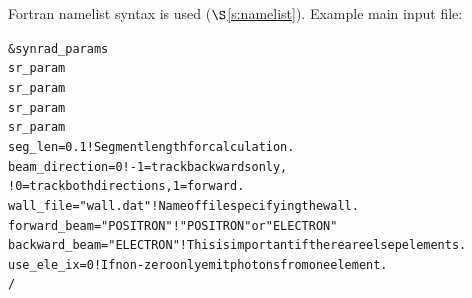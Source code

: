 \documentclass[11pt]{article}
\newcommand{\sref}[1]{$\S$\ref{#1}}
\newenvironment{example}
  {\vspace{-3.0ex} \begin{alltt}}
  {\end{alltt} \vspace{-2.5ex}}
\begin{document}
Fortran namelist syntax is used (\sref{s:namelist}). Example main
input file:
\begin{example}
  &synrad_params
    sr_param%
    sr_param%
    sr_param%
    sr_param%
    seg_len = 0.1                    ! Segment length for calculation.
    beam_direction = 0               ! -1 = track backwards only,
                                     !  0 = track both directions, 1 = forward.
    wall_file = "wall.dat"           ! Name of file specifying the wall.
    forward_beam  = "POSITRON"       ! "POSITRON" or "ELECTRON"
    backward_beam = "ELECTRON"       !  This is important if there are elsep elements.
    use_ele_ix = 0           ! If non-zero only emit photons from one element.
  /
\end{example}
\end{document}
